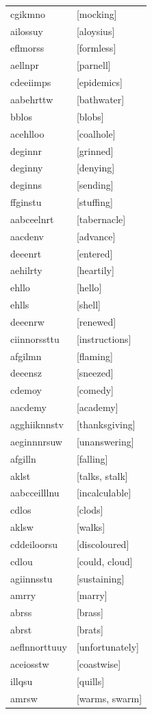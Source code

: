 \documentclass{article}
\begin{document}
\begin{tabular}{ll}
cgikmno & [mocking] \\
ailossuy & [aloysius] \\
eflmorss & [formless] \\
aellnpr & [parnell] \\
cdeeiimps & [epidemics] \\
aabehrttw & [bathwater] \\
bblos & [blobs] \\
acehlloo & [coalhole] \\
deginnr & [grinned] \\
deginny & [denying] \\
deginns & [sending] \\
ffginstu & [stuffing] \\
aabceelnrt & [tabernacle] \\
aacdenv & [advance] \\
deeenrt & [entered] \\
aehilrty & [heartily] \\
ehllo & [hello] \\
ehlls & [shell] \\
deeenrw & [renewed] \\
ciinnorssttu & [instructions] \\
afgilmn & [flaming] \\
deeensz & [sneezed] \\
cdemoy & [comedy] \\
aacdemy & [academy] \\
agghiiknnstv & [thanksgiving] \\
aeginnnrsuw & [unanswering] \\
afgilln & [falling] \\
aklst & [talks, stalk] \\
aabcceilllnu & [incalculable] \\
cdlos & [clods] \\
aklsw & [walks] \\
cddeiloorsu & [discoloured] \\
cdlou & [could, cloud] \\
agiinnsstu & [sustaining] \\
amrry & [marry] \\
abrss & [brass] \\
abrst & [brats] \\
aeflnnorttuuy & [unfortunately] \\
aceiosstw & [coastwise] \\
illqsu & [quills] \\
amrsw & [warms, swarm] \\

\end{tabular}
\end{document}
